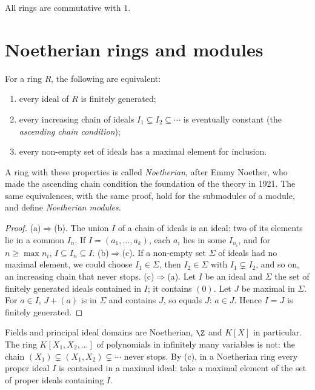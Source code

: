All rings are commutative with $1$.

\section{Noetherian rings and modules}

\begin{proposition}\label{prop:noetherian}
For a ring $R$, the following are equivalent:
\begin{enumerate}[label=(\alph*)]
\item every ideal of $R$ is finitely generated;
\item every increasing chain of ideals $I_1\subseteq I_2\subseteq\cdots$ is eventually constant (the \emph{ascending chain condition});
\item every non-empty set of ideals has a maximal element for inclusion.
\end{enumerate}
A ring with these properties is called \emph{Noetherian}, after Emmy Noether, who made the ascending chain condition the foundation of the theory in 1921. The same equivalences, with the same
proof, hold for the submodules of a module, and define \emph{Noetherian modules}.
\end{proposition}

\begin{proof}
(a)$\Rightarrow$(b). The union $I$ of a chain of ideals is an ideal: two of its elements lie in a common $I_n$. If $I=(a_1,\dots,a_k)$, each $a_i$ lies in some $I_{n_i}$, and for $n\ge\max n_i$, $I\subseteq I_n\subseteq I$.
(b)$\Rightarrow$(c). If a non-empty set $\Sigma$ of ideals had no maximal element, we could choose $I_1\in\Sigma$, then $I_2\in\Sigma$ with $I_1\subsetneq I_2$, and so on, an increasing chain that never stops.
(c)$\Rightarrow$(a). Let $I$ be an ideal and $\Sigma$ the set of finitely generated ideals contained in $I$; it contains $(0)$. Let $J$ be maximal in $\Sigma$. For $a\in I$, $J+(a)$ is in $\Sigma$ and contains $J$, so equals $J$: $a\in J$.
Hence $I=J$ is finitely generated.
\end{proof}

Fields and principal ideal domains are Noetherian, $\Z$ and $K[X]$ in particular. The ring $K[X_1,X_2,\dots]$ of polynomials in infinitely many variables is not: the chain
$(X_1)\subsetneq(X_1,X_2)\subsetneq\cdots$ never stops. By (c), in a Noetherian ring every proper ideal $I$ is contained in a maximal ideal: take a maximal element of the set of proper ideals containing $I$.


